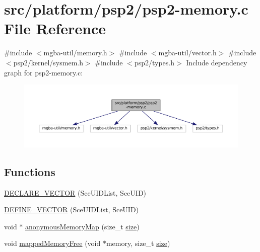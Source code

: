 \hypertarget{psp2-memory_8c}{}\section{src/platform/psp2/psp2-\/memory.c File Reference}
\label{psp2-memory_8c}
{\ttfamily \#include $<$mgba-\/util/memory.\+h$>$}\newline
{\ttfamily \#include $<$mgba-\/util/vector.\+h$>$}\newline
{\ttfamily \#include $<$psp2/kernel/sysmem.\+h$>$}\newline
{\ttfamily \#include $<$psp2/types.\+h$>$}\newline
Include dependency graph for psp2-\/memory.c\+:
\nopagebreak
\begin{figure}[H]
\begin{center}
\leavevmode
\includegraphics[width=350pt]{psp2-memory_8c__incl}
\end{center}
\end{figure}
\subsection*{Functions}
\begin{DoxyCompactItemize}
\item 
\mbox{\hyperlink{psp2-memory_8c_afc4985bd27a308f9ffcf1e1ca30c0f6f}{D\+E\+C\+L\+A\+R\+E\+\_\+\+V\+E\+C\+T\+OR}} (Sce\+U\+I\+D\+List, Sce\+U\+ID)
\item 
\mbox{\hyperlink{psp2-memory_8c_ab213125f95d41a59c47375541575adec}{D\+E\+F\+I\+N\+E\+\_\+\+V\+E\+C\+T\+OR}} (Sce\+U\+I\+D\+List, Sce\+U\+ID)
\item 
void $\ast$ \mbox{\hyperlink{psp2-memory_8c_a5d8b8a54c5a5972efba2981636430417}{anonymous\+Memory\+Map}} (size\+\_\+t \mbox{\hyperlink{ioapi_8h_a014d89bd76f74ef3a29c8f04b473eb76}{size}})
\item 
void \mbox{\hyperlink{psp2-memory_8c_a3542970c4da761e3d6985de6d36d83d3}{mapped\+Memory\+Free}} (void $\ast$memory, size\+\_\+t \mbox{\hyperlink{ioapi_8h_a014d89bd76f74ef3a29c8f04b473eb76}{size}})
\end{DoxyCompactItemize}
